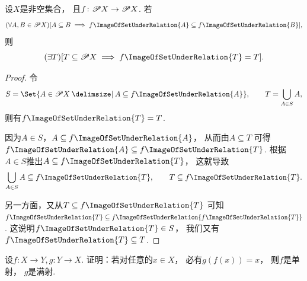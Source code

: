 \begin{example}
设\(X\)是非空集合，
且\(f\colon \mathscr{P} X \to \mathscr{P} X\).
若\begin{equation*}
	(\forall A,B \in \Powerset X)
	[
		A \subseteq B
		\implies
		f\ImageOfSetUnderRelation{A} \subseteq f\ImageOfSetUnderRelation{B}
	],
\end{equation*}
则\begin{equation*}
	(\exists T)
	[
		T \subseteq \Powerset X
		\implies
		f\ImageOfSetUnderRelation{T} = T
	].
\end{equation*}
\begin{proof}
令\begin{equation*}
	S = \Set{ A \in \Powerset X \given A \subseteq f\ImageOfSetUnderRelation{A} },
	\qquad
	T = \bigcup_{A \in S} A,
\end{equation*}
则有\(f\ImageOfSetUnderRelation{T} = T\).

因为\(A \in S\)，\(A \subseteq f\ImageOfSetUnderRelation{A}\)，
从而由\(A \subseteq T\)
可得\(f\ImageOfSetUnderRelation{A} \subseteq f\ImageOfSetUnderRelation{T}\).
根据\(A \in S\)推出\(A \subseteq f\ImageOfSetUnderRelation{T}\)，
这就导致\begin{equation*}
	\bigcup_{A \in S} A \subseteq f\ImageOfSetUnderRelation{T},
	\qquad
	T \subseteq f\ImageOfSetUnderRelation{T}.
\end{equation*}

另一方面，又从\(T \subseteq f\ImageOfSetUnderRelation{T}\)
可知\(f\ImageOfSetUnderRelation{T} \subseteq f\ImageOfSetUnderRelation{f\ImageOfSetUnderRelation{T}}\).
这说明\(f\ImageOfSetUnderRelation{T} \in S\)，
我们又有\(f\ImageOfSetUnderRelation{T} \subseteq T\).
\end{proof}
\end{example}

\begin{example}
设\(f\colon X \to Y,
g\colon Y \to X\).
证明：若对任意的\(x \in X\)，
必有\(g(f(x)) = x\)，
则\(f\)是单射，
\(g\)是满射.
\end{example}

